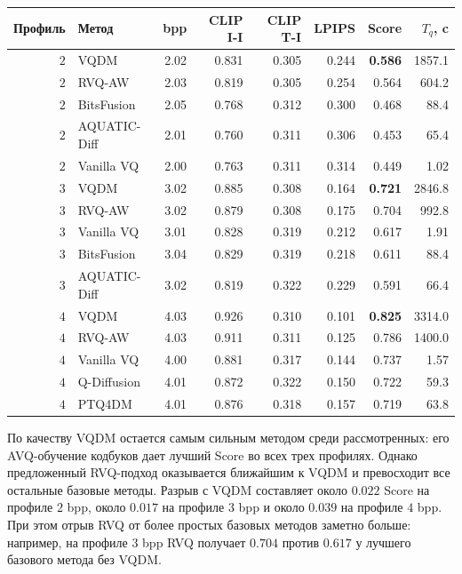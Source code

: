 \documentclass[a4paper,12pt]{article}
\begin{document}
\begin{center}
\small
\begin{tabular}{rlrrrrrr}
\hline
Профиль & Метод & bpp & CLIP I-I & CLIP T-I & LPIPS & Score & $T_q$, c \\
\hline
$2$ & VQDM & 2.02 & 0.831 & 0.305 & 0.244 & \textbf{0.586} & 1857.1 \\
$2$ & RVQ-AW & 2.03 & 0.819 & 0.305 & 0.254 & 0.564 & 604.2 \\
$2$ & BitsFusion & 2.05 & 0.768 & 0.312 & 0.300 & 0.468 & 88.4 \\
$2$ & AQUATIC-Diff & 2.01 & 0.760 & 0.311 & 0.306 & 0.453 & 65.4 \\
$2$ & Vanilla VQ & 2.00 & 0.763 & 0.311 & 0.314 & 0.449 & 1.02 \\
\hline
$3$ & VQDM & 3.02 & 0.885 & 0.308 & 0.164 & \textbf{0.721} & 2846.8 \\
$3$ & RVQ-AW & 3.02 & 0.879 & 0.308 & 0.175 & 0.704 & 992.8 \\
$3$ & Vanilla VQ & 3.01 & 0.828 & 0.319 & 0.212 & 0.617 & 1.91 \\
$3$ & BitsFusion & 3.04 & 0.829 & 0.319 & 0.218 & 0.611 & 88.4 \\
$3$ & AQUATIC-Diff & 3.02 & 0.819 & 0.322 & 0.229 & 0.591 & 66.4 \\
\hline
$4$ & VQDM & 4.03 & 0.926 & 0.310 & 0.101 & \textbf{0.825} & 3314.0 \\
$4$ & RVQ-AW & 4.03 & 0.911 & 0.311 & 0.125 & 0.786 & 1400.0 \\
$4$ & Vanilla VQ & 4.00 & 0.881 & 0.317 & 0.144 & 0.737 & 1.57 \\
$4$ & Q-Diffusion & 4.01 & 0.872 & 0.322 & 0.150 & 0.722 & 59.3 \\
$4$ & PTQ4DM & 4.01 & 0.876 & 0.318 & 0.157 & 0.719 & 63.8 \\
\hline
\end{tabular}
\end{center}

По качеству VQDM остается самым сильным методом среди рассмотренных: его AVQ-обучение кодбуков дает лучший Score во всех трех профилях. Однако предложенный RVQ-подход оказывается ближайшим к VQDM и превосходит все остальные базовые методы. Разрыв с VQDM составляет около $0.022$ Score на профиле $2$ bpp, около $0.017$ на профиле $3$ bpp и около $0.039$ на профиле $4$ bpp. При этом отрыв RVQ от более простых базовых методов заметно больше: например, на профиле $3$ bpp RVQ получает $0.704$ против $0.617$ у лучшего базового метода без VQDM.
\end{document}
